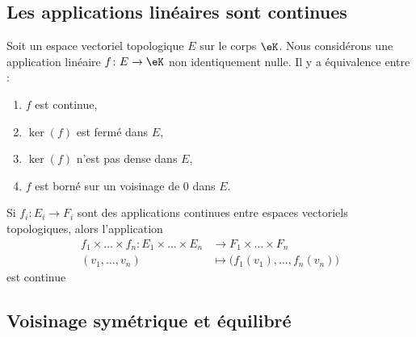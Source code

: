 \subsection{Les applications linéaires sont continues}


\begin{proposition}	\label{PROPooWZHBooFXDRKH}
	Soit un espace vectoriel topologique \( E\) sur le corps \( \eK\). Nous considérons une application linéaire \(f \colon E\to \eK  \) non identiquement nulle. Il y a équivalence entre :
	\begin{enumerate}
		\item
		      \( f\) est continue,
		\item
		      \( \ker(f)\) est fermé dans \( E\),
		\item
		      \( \ker(f)\) n'est pas dense dans \( E\),
		\item
		      \( f\) est borné sur un voisinage de \( 0\) dans \( E\).
	\end{enumerate}
\end{proposition}

\begin{proposition}	\label{PROPooWZXCooXfyLMK}
	Si \(f_i \colon E_i\to F_i  \) sont des applications continues entre espaces vectoriels topologiques, alors l'application
	\begin{equation}
		\begin{aligned}
			f_1\times \ldots \times f_n\colon E_1\times\ldots\times E_n & \to F_1\times \ldots\times F_n                \\
			(v_1,\ldots,v_n)                                            & \mapsto \big( f_1(v_1),\ldots, f_n(v_n) \big)
		\end{aligned}
	\end{equation}
	est continue
\end{proposition}


\subsection{Voisinage symétrique et équilibré}

